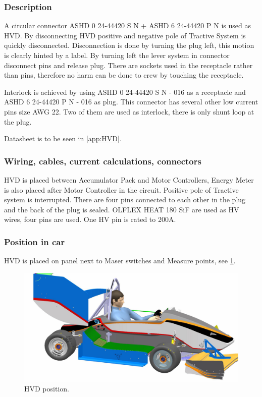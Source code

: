 \subsubsection{Description}

A circular connector ASHD 0 24-44420 S N + ASHD 6 24-44420 P N is used as HVD. By disconnecting HVD positive and negative pole of Tractive System is quickly disconnected. Disconnection is done by turning the plug left, this motion is clearly hinted by a label. By turning left the lever system in connector disconnect pins and release plug. There are sockets used in the receptacle rather than pins, therefore no harm can be done to crew by touching the receptacle. 

Interlock is achieved by using ASHD 0 24-44420 S N - 016 as a receptacle and ASHD 6 24-44420 P N - 016 as plug. This connector has several other low current pins size AWG 22. Two of them are used as interlock, there is only shunt loop at the plug.

Datasheet is to be seen in \ref{app:HVD}.

\subsubsection{Wiring, cables, current calculations, connectors}

HVD is placed between Accumulator Pack and Motor Controllers, Energy Meter is also placed after Motor Controller in the circuit. Positive pole of Tractive system is interrupted. There are four pins connected to each other in the plug and the back of the plug is sealed. OLFLEX HEAT 180 SiF are used as HV wires, four pins are used. One HV pin is rated to 200A.

\subsubsection{Position in car}

HVD is placed on panel next to Maser switches and Measure points, see \ref{fig:hvd-position}.

\begin{figure}[H]
	\centering
	\includegraphics[width=\textwidth,trim={15cm 2cm 15cm 5cm},clip]{./img/hvd-position.jpg}
	\caption{HVD position.}
	\label{fig:hvd-position}
\end{figure}
